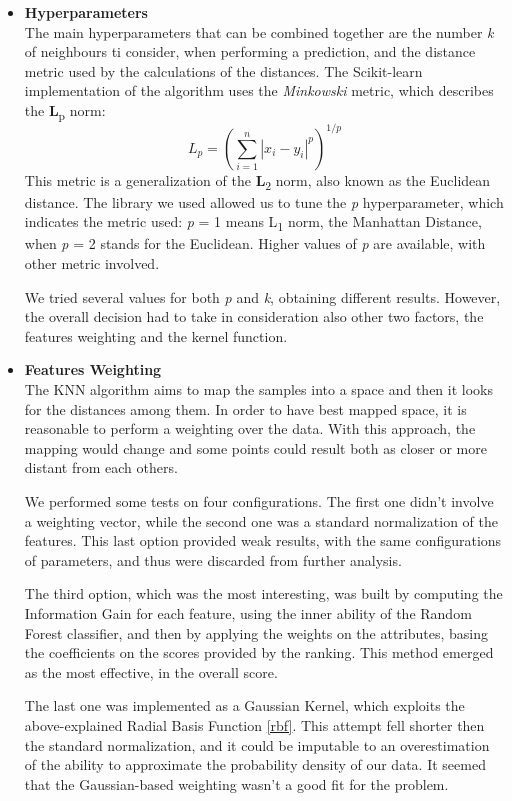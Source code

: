 \begin{itemize}
	\item[\PencilRight]\textbf{Hyperparameters}\\
	The main hyperparameters that can be combined together are the number \textit{k} of neighbours ti consider, when performing a prediction, and the distance metric used by the calculations of the distances.
	The Scikit-learn implementation of the algorithm uses the \textit{Minkowski} metric, which describes the \textbf{L}\textsubscript{p} norm: 
	\[ \mathit{L_{p}} = (\sum\limits_{i = 1}^{n}|x_{i} - y_{i}|^{p})^{1/p} \]
	This metric is a generalization of the \textbf{L}\textsubscript{2} norm, also known as the Euclidean distance.
	The library we used allowed us to tune the \textit{p} hyperparameter, which indicates the metric used: \textit{p} = 1 means L\textsubscript{1} norm, the Manhattan Distance, when \textit{p} = 2 stands for the Euclidean.
	Higher values of \textit{p} are available, with other metric involved.
	
	We tried several values for both \textit{p} and \textit{k}, obtaining different results.
	However, the overall decision had to take in consideration also other two factors, the features weighting and the kernel function.
	
	\item[\PencilRight]\textbf{Features Weighting}\\
	The KNN algorithm aims to map the samples into a space and then it looks for the distances among them. In order to have best mapped space, it is reasonable to perform a weighting over the data. With this approach, the mapping would change and some points could result both as closer or more distant from each others.
	
	We performed some tests on four configurations. The first one didn't involve a weighting vector, while the second one was a standard normalization of the features.
	This last option provided weak results, with the same configurations of parameters, and thus were discarded from further analysis.

	The third option, which was the most interesting, was built by computing the Information Gain for each feature, using the inner ability of the Random Forest classifier, and then by applying the weights on the attributes, basing the coefficients on the scores provided by the ranking.
	This method emerged as the most effective, in the overall score.
	
	The last one was implemented as a Gaussian Kernel, which exploits the above-explained Radial Basis Function \ref{rbf}.
	This attempt fell shorter then the standard normalization, and it could be imputable to an overestimation of the ability to approximate the probability density of our data.
	It seemed that the Gaussian-based weighting wasn't a good fit for the problem.
\end{itemize}


